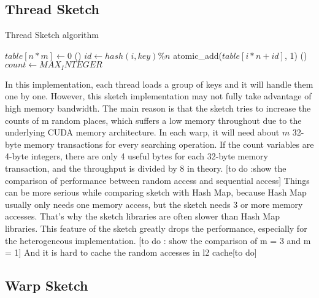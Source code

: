 \documentclass[conference]{IEEEtran}
\begin{document}
\subsection{Thread Sketch}
\begin{algorithm}
    \DontPrintSemicolon
    \caption{Thread Sketch algorithm}
    $table[n * m] \longleftarrow 0$\;
\Fn(){}
{
    {
        {
            $id \leftarrow hash(i, key) \% n$\;
            atomic\_add($table[i * n + id]$, 1)\;
        }
    }
}
\Fn(){}
{
    {
        $count \leftarrow MAX_INTEGER$\;
    }
}

\end{algorithm}

In this implementation, each thread loads a group of keys and it will handle them one by one. However, this sketch implementation may not fully take advantage of high memory bandwidth. The main reason is that the sketch tries to increase the counts of m random places, which suffers a low memory throughout due to the underlying CUDA memory architecture. In each warp, it will need about $m$ 32-byte memory transactions for every searching operation. If the count variables are 4-byte integers, there are only 4 useful bytes for each 32-byte memory transaction, and the throughput is divided by 8 in theory. 
[to do :show the comparison of performance between random access and sequential access]
Things can be more serious while comparing sketch with Hash Map, because Hash Map usually only needs one memory access, but the sketch needs 3 or more memory accesses. That's why the sketch libraries are often slower than Hash Map libraries. This feature of the sketch greatly drops the performance, especially for the heterogeneous implementation. [to do : show the comparison of m = 3 and m = 1]
And it is hard to cache the random accesses in l2 cache[to do]
\subsection{Warp Sketch}
\end{document}
